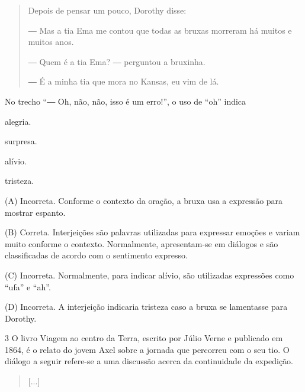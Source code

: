 \begin{escolha}
\begin{escolha}
{\begin{escolha}
\begin{quote}
Depois de pensar um pouco, Dorothy disse:

― Mas a tia Ema me contou que todas as bruxas morreram há muitos e
muitos anos.

― Quem é a tia Ema? ― perguntou a bruxinha.

― É a minha tia que mora no Kansas, eu vim de lá.
\end{quote}


No trecho ``― Oh, não, não, isso é um erro!'', o uso de ``oh'' indica

\begin{escolha}
\item alegria.

\item surpresa.

\item alívio.

\item tristeza.
\end{escolha}


(A) Incorreta. Conforme o contexto da oração, a bruxa usa a expressão
para mostrar espanto.

(B) Correta. Interjeições são palavras utilizadas para expressar emoções
e variam muito conforme o contexto. Normalmente, apresentam-se em
diálogos e são classificadas de acordo com o sentimento expresso.

(C) Incorreta. Normalmente, para indicar alívio, são utilizadas
expressões como ``ufa'' e ``ah''.

(D) Incorreta. A interjeição indicaria tristeza caso a bruxa se
lamentasse para Dorothy.

\num{3} O livro Viagem ao centro da Terra, escrito por Júlio Verne e
publicado em 1864, é o relato do jovem Axel sobre a jornada que
percorreu com o seu tio. O diálogo a seguir refere-se a uma discussão
acerca da continuidade da expedição.

\begin{quote}
{[}...{]}


\end{quote}
\end{escolha}}
\end{escolha}
\end{escolha}
